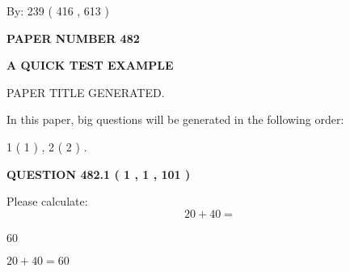 \documentclass[12pt]{article}
\begin{document}
   
\hspace{1.0in} By: 
 239 ( 416 ,  613 )
   
   
   
   
\newpage 
\setcounter{page}{ 
   482001 } 
   
   
   
   
 {\textbf{ \Large{ PAPER NUMBER  482  }}}
   
   
\vspace{0.2in}
   
   
   
   
   
   
   
   
 \vspace{0.2in}
{\LARGE {\textbf{ A QUICK TEST EXAMPLE}}}
   
   
 PAPER TITLE GENERATED.
   
   
   
\vspace{0.2in}
   
In this paper, big questions will be generated in the following order: 
   
   
   1 ( 1 )
 ,
   2 ( 2 )
 .
  
\vspace{0.2in}
  
{\textbf{\Large{QUESTION
482.1 
 ( 1 , 1 , 101 )
}}}
  
  
 
Please calculate:
\begin{equation}
20 +  %
40 = \nonumber
\end{equation}
 
 
 
\noindent{}
 
 

60
 
 
\noindent{}
 
 

 
 
 
\noindent{}
 
 

$ %
20 +  %
40=   %
60$
 
 
\noindent{}
 
\end{document}
